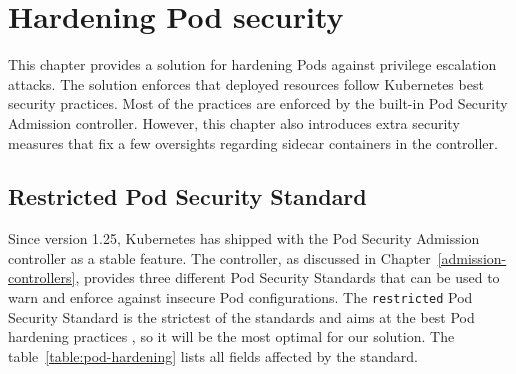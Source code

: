 \documentclass[english, 12pt, a4paper, sci, utf8, a-2b, online]{aaltothesis}
\begin{document}
\clearpage

\section{Hardening Pod security} \label{sec:pod-hardening}

This chapter provides a solution for hardening Pods against privilege escalation attacks.
The solution enforces that deployed resources follow Kubernetes best security practices.
Most of the practices are enforced by the built-in Pod Security Admission controller.
However, this chapter also introduces extra security measures that fix a few oversights regarding sidecar containers in the controller.


\subsection{Restricted Pod Security Standard}

Since version 1.25, Kubernetes has shipped with the Pod Security Admission controller as a stable feature.
The controller, as discussed in Chapter~\ref{admission-controllers}, provides three different Pod Security Standards that can be used to warn and enforce against insecure Pod configurations.
The \texttt{restricted} Pod Security Standard is the strictest of the standards and aims at the best Pod hardening practices \cite{k8s-docs-pss}, so it will be the most optimal for our solution.
The table~\ref{table:pod-hardening} lists all fields affected by the standard.
\end{document}
